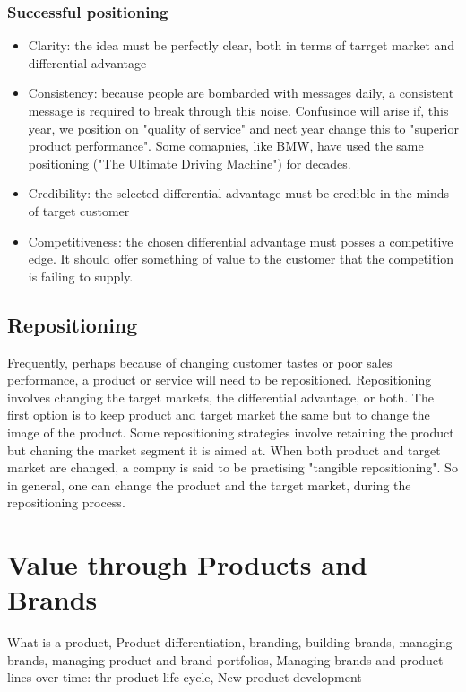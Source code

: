 \documentclass{article}
\begin{document}
\subsubsection{Successful positioning}
\begin{itemize}
    \item Clarity: the idea must be perfectly clear, both in terms of tarrget market and differential advantage
    \item Consistency: because people are bombarded with messages daily, a consistent message is required to break through this noise. Confusinoe will arise if, this year, we position on "quality of service" and nect year change this to "superior product performance". Some comapnies, like BMW, have used the same positioning ("The Ultimate Driving Machine") for decades.
    \item Credibility: the selected differential advantage must be credible in the minds of target customer
    \item Competitiveness: the chosen differential advantage must posses a competitive edge. It should offer something of value to the customer that the competition is failing to supply.
\end{itemize}

\subsection{Repositioning}
Frequently, perhaps because of changing customer tastes or poor sales performance, a product or service will need to be repositioned. Repositioning involves changing the target markets, the differential advantage, or both. The first option is to keep product and target market the same but to change the image of the product.  Some repositioning strategies involve retaining the product but chaning the market segment it is aimed at. When both product and target market are changed, a compny is said to be practising "tangible repositioning". So in general, one can change the product and the target market, during the repositioning process.

\section{Value through Products and Brands}
What is a product, Product differentiation, branding, building brands, managing brands, managing product and brand portfolios, Managing brands and product lines over time: thr product life cycle, New product development
\end{document}
